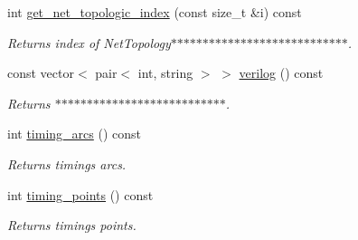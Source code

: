 \begin{DoxyCompactItemize}
int \hyperlink{classCircuit__Netlist_a92fd5d0cfc1c5951b5ff1f31dfff2f05}{get\-\_\-net\-\_\-topologic\-\_\-index} (const size\-\_\-t \&i) const 
\begin{DoxyCompactList}\small\item\em Returns index of Net\-Topology$\ast$$\ast$$\ast$$\ast$$\ast$$\ast$$\ast$$\ast$$\ast$$\ast$$\ast$$\ast$$\ast$$\ast$$\ast$$\ast$$\ast$$\ast$$\ast$$\ast$$\ast$$\ast$$\ast$$\ast$$\ast$$\ast$$\ast$$\ast$. \end{DoxyCompactList}\item 
const vector$<$ pair$<$ int, string $>$ $>$ \hyperlink{classCircuit__Netlist_a4638908b9a2c640b61f534edf048cdf7}{verilog} () const 
\begin{DoxyCompactList}\small\item\em Returns $\ast$$\ast$$\ast$$\ast$$\ast$$\ast$$\ast$$\ast$$\ast$$\ast$$\ast$$\ast$$\ast$$\ast$$\ast$$\ast$$\ast$$\ast$$\ast$$\ast$$\ast$$\ast$$\ast$$\ast$$\ast$$\ast$$\ast$. \end{DoxyCompactList}\item 
int \hyperlink{classCircuit__Netlist_a8ada85e3c30b4787a46c7b8396cf640a}{timing\-\_\-arcs} () const 
\begin{DoxyCompactList}\small\item\em Returns timings arcs. \end{DoxyCompactList}\item 
int \hyperlink{classCircuit__Netlist_a070452269f2c7109f6ca089ae34dd752}{timing\-\_\-points} () const 
\begin{DoxyCompactList}\small\item\em Returns timings points. \end{DoxyCompactList}\end{DoxyCompactItemize}
